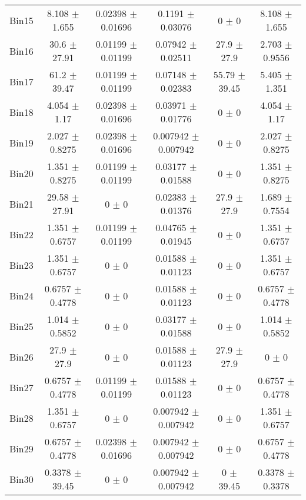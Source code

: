 \begin{tabular}{@{\extracolsep{4pt}}lccccc@{}}
     Bin15 & 8.108 $\pm$ 1.655 & 0.02398 $\pm$ 0.01696 & 0.1191 $\pm$ 0.03076 & 0 $\pm$ 0 & 8.108 $\pm$ 1.655 \\ 
     Bin16 & 30.6 $\pm$ 27.91 & 0.01199 $\pm$ 0.01199 & 0.07942 $\pm$ 0.02511 & 27.9 $\pm$ 27.9 & 2.703 $\pm$ 0.9556 \\ 
     Bin17 & 61.2 $\pm$ 39.47 & 0.01199 $\pm$ 0.01199 & 0.07148 $\pm$ 0.02383 & 55.79 $\pm$ 39.45 & 5.405 $\pm$ 1.351 \\ 
     Bin18 & 4.054 $\pm$ 1.17 & 0.02398 $\pm$ 0.01696 & 0.03971 $\pm$ 0.01776 & 0 $\pm$ 0 & 4.054 $\pm$ 1.17 \\ 
     Bin19 & 2.027 $\pm$ 0.8275 & 0.02398 $\pm$ 0.01696 & 0.007942 $\pm$ 0.007942 & 0 $\pm$ 0 & 2.027 $\pm$ 0.8275 \\ 
     Bin20 & 1.351 $\pm$ 0.8275 & 0.01199 $\pm$ 0.01199 & 0.03177 $\pm$ 0.01588 & 0 $\pm$ 0 & 1.351 $\pm$ 0.8275 \\ 
     Bin21 & 29.58 $\pm$ 27.91 & 0 $\pm$ 0 & 0.02383 $\pm$ 0.01376 & 27.9 $\pm$ 27.9 & 1.689 $\pm$ 0.7554 \\ 
     Bin22 & 1.351 $\pm$ 0.6757 & 0.01199 $\pm$ 0.01199 & 0.04765 $\pm$ 0.01945 & 0 $\pm$ 0 & 1.351 $\pm$ 0.6757 \\ 
     Bin23 & 1.351 $\pm$ 0.6757 & 0 $\pm$ 0 & 0.01588 $\pm$ 0.01123 & 0 $\pm$ 0 & 1.351 $\pm$ 0.6757 \\ 
     Bin24 & 0.6757 $\pm$ 0.4778 & 0 $\pm$ 0 & 0.01588 $\pm$ 0.01123 & 0 $\pm$ 0 & 0.6757 $\pm$ 0.4778 \\ 
     Bin25 & 1.014 $\pm$ 0.5852 & 0 $\pm$ 0 & 0.03177 $\pm$ 0.01588 & 0 $\pm$ 0 & 1.014 $\pm$ 0.5852 \\ 
     Bin26 & 27.9 $\pm$ 27.9 & 0 $\pm$ 0 & 0.01588 $\pm$ 0.01123 & 27.9 $\pm$ 27.9 & 0 $\pm$ 0 \\ 
     Bin27 & 0.6757 $\pm$ 0.4778 & 0.01199 $\pm$ 0.01199 & 0.01588 $\pm$ 0.01123 & 0 $\pm$ 0 & 0.6757 $\pm$ 0.4778 \\ 
     Bin28 & 1.351 $\pm$ 0.6757 & 0 $\pm$ 0 & 0.007942 $\pm$ 0.007942 & 0 $\pm$ 0 & 1.351 $\pm$ 0.6757 \\ 
     Bin29 & 0.6757 $\pm$ 0.4778 & 0.02398 $\pm$ 0.01696 & 0.007942 $\pm$ 0.007942 & 0 $\pm$ 0 & 0.6757 $\pm$ 0.4778 \\ 
     Bin30 & 0.3378 $\pm$ 39.45 & 0 $\pm$ 0 & 0.007942 $\pm$ 0.007942 & 0 $\pm$ 39.45 & 0.3378 $\pm$ 0.3378 \\ 
\hline\hline
  \end{tabular}
